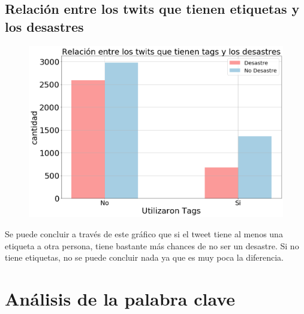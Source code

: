 \documentclass[titlepage,a4paper]{article}
\begin{document}
\subsection{\Large Relación entre los twits que tienen etiquetas y los desastres}
{\Large
\begin{figure}[H]
 \centering
 \includegraphics[width=1\textwidth, height=1\textheight, keepaspectratio]{graficos/relacion_etiquetas.png}
\end{figure}
Se puede concluir a través de este gráfico que si el tweet tiene al menos una etiqueta a otra persona, tiene bastante más chances de no ser un desastre. Si no tiene etiquetas, no se puede concluir nada ya que es muy poca la diferencia.
\par}
\section{\Large Análisis de la palabra clave}
\end{document}
